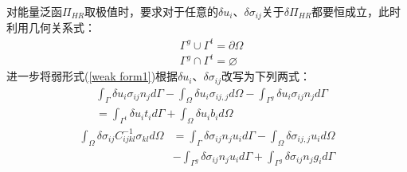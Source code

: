对能量泛函$\Pi_{H\!R}$取极值时，要求对于任意的$\delta u_i$、$\delta\sigma_{ij}$关于$\delta\Pi_{H\!R}$都要恒成立，此时利用几何关系式：
\begin{equation}
\begin{split}
    &\Gamma^g\cup \Gamma^t=\partial\Omega\\
    &\Gamma^g\cap \Gamma^t=\varnothing
\end{split}
\end{equation}
进一步将弱形式(\ref{weak form1})根据$\delta u_i$、$\delta\sigma_{ij}$改写为下列两式：
\begin{equation}\label{deltau}
\begin{split}
    &\int_{\Gamma}\delta u_i\sigma_{ij}n_jd\Gamma-\int_{\Omega}\delta u_i\sigma_{ij,j}d\Omega-\int_{\Gamma^g}\delta u_i\sigma_{ij}n_jd\Gamma\\
    &=\int_{\Gamma^t}\delta u_it_id\Gamma+\int_{\Omega}\delta u_ib_id\Omega
\end{split}
\end{equation} 
\begin{equation}\label{deltasigma}
\begin{split}
    \int_{\Omega}\delta\sigma_{ij}C^{-1}_{ijkl}\sigma_{kl}d\Omega&=\int_{\Gamma}\delta\sigma_{ij}n_ju_id\Gamma-\int_{\Omega}\delta\sigma_{ij,j}u_id\Omega\\
    &-\int_{\Gamma^g}\delta\sigma_{ij}n_ju_id\Gamma+\int_{\Gamma^g}\delta\sigma_{ij}n_jg_id\Gamma
\end{split}
\end{equation}    
